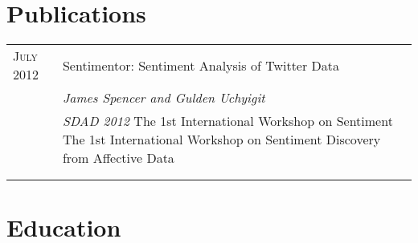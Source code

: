 \documentclass[a4paper,10pt]{article} %
\begin{document}
\section{Publications}

\begin{tabular}{ L{2cm} | L{11cm}}	
\textsc{July} 2012 & Sentimentor: Sentiment Analysis of Twitter Data\\
& \small\emph{James Spencer and Gulden Uchyigit} \\
& \small\emph{SDAD 2012} The 1st International Workshop on Sentiment The 1st International Workshop on Sentiment Discovery from Affective Data\\


&\normalsize \\
&\\
\end{tabular}



\section{Education}
\end{document}
